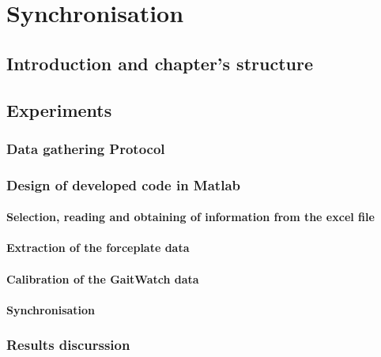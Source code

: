 \chapter{Synchronisation}
\label{ch:Synchronisation}

\section{Introduction and chapter's structure}

\section{Experiments}

	\subsection{Data gathering Protocol}
	\subsection{Design of developed code  in Matlab}
	\subsubsection{Selection, reading and obtaining of information from the excel file}
	\subsubsection{Extraction of the forceplate data}
	\subsubsection{Calibration of the GaitWatch data}
	\subsubsection{Synchronisation}	
	\subsection{Results discurssion}